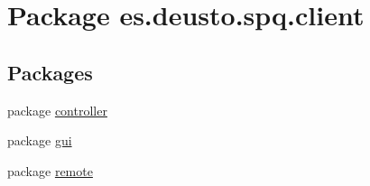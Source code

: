 \hypertarget{namespacees_1_1deusto_1_1spq_1_1client}{}\section{Package es.\+deusto.\+spq.\+client}
\label{namespacees_1_1deusto_1_1spq_1_1client}
\subsection*{Packages}
\begin{DoxyCompactItemize}
\item 
package \hyperlink{namespacees_1_1deusto_1_1spq_1_1client_1_1controller}{controller}
\item 
package \hyperlink{namespacees_1_1deusto_1_1spq_1_1client_1_1gui}{gui}
\item 
package \hyperlink{namespacees_1_1deusto_1_1spq_1_1client_1_1remote}{remote}
\end{DoxyCompactItemize}
